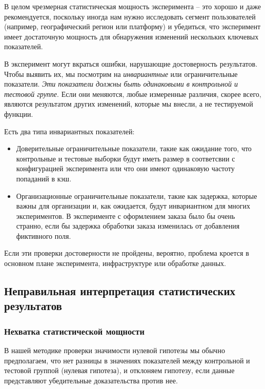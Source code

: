 \documentclass[%
	11pt,
	a4paper,
	utf8,
		]{article}
\begin{document}
В целом чрезмерная статистическая мощность эксперимента -- это хорошо и даже рекомендуется, поскольку иногда нам нужно исследовать сегмент пользователей (например, географический регион или платформу) и убедиться, что эксперимент имеет достаточную мощность для обнаружения изменений нескольких ключевых показателей.

В эксперимент могут вкраться ошибки, нарушающие достоверность результатов. Чтобы выявить их, мы посмотрим на \emph{инвариантные} или ограничительные показатели. \emph{Эти показатели должны быть одинаковыми в контрольной и тестовой группе}. Если они меняются, любые измеренные различия, скорее всего, являются результатом других изменений, которые мы внесли, а не тестируемой функции.

Есть два типа инвариантных показателей:
\begin{itemize}
	\item Доверительные ограничительные показатели, такие как ожидание того, что контрольные и тестовые выборки будут иметь размер в соответсвии с конфигурацией эксперимента или что они имеют одинаковую частоту попаданий в кэш.
	
	\item Организационные ограничительные показатели, такие как задержка, которые важны для организации и, как ожидается, будут инвариантном для многих экспериментов. В эксперименте с оформлением заказа было бы очень странно, если бы задержка обработки заказа изменилась от добавления фиктивного поля.
\end{itemize}

Если эти проверки достоверности не пройдены, вероятно, проблема кроется в основном плане эксперимента, инфраструктуре или обработке данных.

\subsection{Неправильная интерпретация статистических результатов}

\subsubsection{Нехватка статистической мощности}

В нашей методике проверки значимости нулевой гипотезы мы обычно предполагаем, что нет разницы в значениях показателей между контрольной и тестовой группой (нулевая гипотеза), и отклоняем гипотезу, если данные представляют убедительные доказательства против нее.
\end{document}
